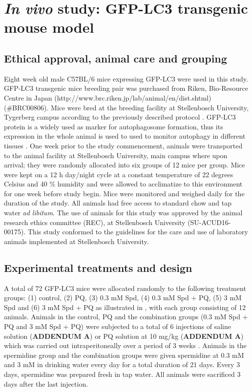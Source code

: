 \section{\textit{In vivo} study: GFP-LC3 transgenic mouse model}
\subsection{Ethical approval, animal care and grouping}
Eight week old male C57BL/6 mice expressing GFP-LC3 were used in this study. GFP-LC3 transgenic mice breeding pair was purchased from Riken, Bio-Resource Centre in Japan (http://www.brc.riken.jp/lab/animal/en/dist.shtml) (\#BRC00806). Mice were bred at the breeding facility at Stellenbosch University, Tygerberg campus according to the previously described protocol \citep{Mizushima2009,Mizushima2004a}. GFP-LC3 protein is a widely used as marker for autophagosome formation, thus its expression in the whole animal is used to used to monitor autophagy in different tissues \citep{Mizushima2009}. One week prior to the study commencement, animals were transported to the animal facility at Stellenbosch University, main campus where upon arrival; they were randomly allocated into six groups of 12 mice per group. Mice were kept on a 12 h day/night cycle at a constant temperature of 22 degrees Celsius and 40 \% humidity and were allowed to acclimatize to this environment for one week before study begin. Mice were monitored and weighed daily for the duration of the study. All animals had free access to standard chow and tap water \textit{ad libitum}. The use of animals for this study was approved by the animal research ethics committee (REC), at Stellenbosch University (SU-ACUD16-00175). This study conformed to the guidelines for the care and use of laboratory animals implemented at Stellenbosch University.

\subsection{Experimental treatments and design}
A total of 72 GFP-LC3 mice were allocated randomly to the following treatment groups: (1) control, (2) PQ, (3) 0.3 mM Spd, (4) 0.3 mM Spd + PQ, (5) 3 mM Spd and (6) 3 mM Spd + PQ as illustrated in  , with each group consisting of 12 animals. Animals in the control, PQ and the combination groups (0.3 mM Spd + PQ and 3 mM Spd + PQ) were subjected to a total of 6 injections of saline solution (\textbf{ADDENDUM A}) or PQ solution at 10 mg/kg (\textbf{ADDENDUM A}) which was carried out intraperitoneally over a period of 3 weeks \citep{Chen2012}. Animals in the spermidine group and the combination groups were given spermidine at 0.3 mM and 3 mM in drinking water every day for a total duration of 21 days. Every 3 days, spermidine was prepared fresh in tap water. All animals were sacrificed 3 days after the last injection.

